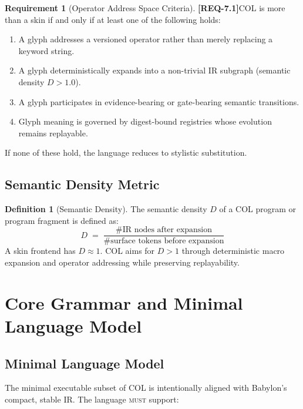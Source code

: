 \documentclass[11pt,a4paper,twoside]{article}
\theoremstyle{definition}
\newtheorem{requirement}{Requirement}[section]
\newtheorem{definition}{Definition}[section]
\theoremstyle{remark}
\newcommand{\req}[1]{\textbf{\textcolor{reqred}{[REQ-#1]}}}
\newcommand{\must}{\textsc{must}}
\begin{document}
\begin{requirement}[Operator Address Space Criteria]
\label{req:operator-criteria}
\req{7.1}\quad COL is more than a skin if and only if at least one of the following holds:
\begin{enumerate}[label=(\roman*),nosep]
  \item A glyph addresses a versioned operator rather than merely replacing a keyword string.
  \item A glyph deterministically expands into a non-trivial IR subgraph (semantic density $D > 1.0$).
  \item A glyph participates in evidence-bearing or gate-bearing semantic transitions.
  \item Glyph meaning is governed by digest-bound registries whose evolution remains replayable.
\end{enumerate}
If none of these hold, the language reduces to stylistic substitution.
\end{requirement}

\subsection{Semantic Density Metric}

\begin{definition}[Semantic Density]
The semantic density $D$ of a COL program or program fragment is defined as:
\[
  D \;=\; \frac{\#\text{IR nodes after expansion}}{\#\text{surface tokens before expansion}}
\]
A skin frontend has $D \approx 1$. COL aims for $D > 1$ through deterministic macro expansion and operator addressing while preserving replayability.
\end{definition}



\section{Core Grammar and Minimal Language Model}
\label{sec:grammar}

\subsection{Minimal Language Model}
\label{sec:minimal-lang}

The minimal executable subset of COL is intentionally aligned with Babylon's compact, stable IR. The language \must{} support:
\end{document}
